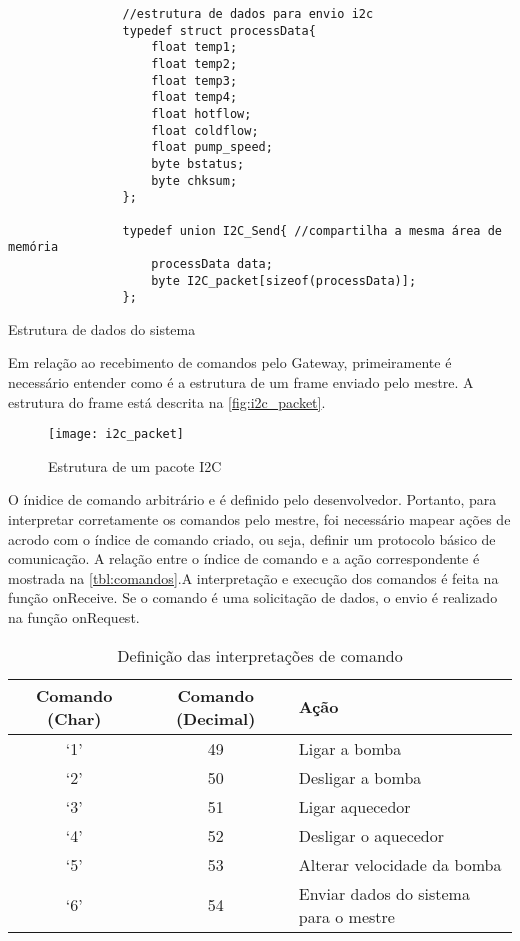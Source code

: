 			\begin{listing}[!htb]
				\begin{verbatim}
				//estrutura de dados para envio i2c
				typedef struct processData{
					float temp1;
					float temp2;
					float temp3;
					float temp4;
					float hotflow;
					float coldflow;
					float pump_speed;
					byte bstatus;
					byte chksum;
				};
				
				typedef union I2C_Send{ //compartilha a mesma área de memória
					processData data;
					byte I2C_packet[sizeof(processData)];
				};				
				\end{verbatim}
				\caption{Estrutura de dados do sistema}
				\label{cod:dadosi2c}
			\end{listing}
			
			Em relação ao recebimento de comandos pelo Gateway, primeiramente é necessário entender como é a estrutura de um frame enviado pelo mestre. A estrutura do frame está descrita na \autoref{fig:i2c_packet}.
			
			\begin{figure}[!htb]	
				\captionsetup{justification=centering}
				\begin{center}
					\texttt{[image: i2c\_packet]}  %
					\caption[Estrutura de um pacote I2C]{\label{fig:i2c_packet}Estrutura de um pacote I2C}
				\end{center}		
			\end{figure}
		
			O ínidice de comando arbitrário e é definido pelo desenvolvedor. Portanto, para interpretar corretamente os comandos pelo mestre, foi necessário mapear ações de acrodo com o índice de comando criado, ou seja, definir um protocolo básico de comunicação. A relação entre o índice de comando e a ação correspondente é mostrada na \autoref{tbl:comandos}.A interpretação e execução dos comandos é feita na função onReceive. Se o comando é uma solicitação de dados, o envio é realizado na função onRequest.
			
			\begin{table}[!htb]
				\centering
				\caption{Definição das interpretações de comando}
				\label{tbl:comandos}
				\def\arraystretch{1.3}
				\begin{tabular}{c c l}
					\hline
					\textbf{Comando (Char)} & \textbf{Comando (Decimal)} & \textbf{Ação}  \\ \hline
					
					`1' & 49 & Ligar a bomba \\ %
					`2' & 50 & Desligar a bomba \\ %
					`3' & 51 & Ligar aquecedor \\ %
					`4' & 52 & Desligar o aquecedor \\ %
					`5' & 53 & Alterar velocidade da bomba \\
					`6' & 54 & Enviar dados do sistema para o mestre \\ %
					\hline
				\end{tabular}
			\end{table}
		
